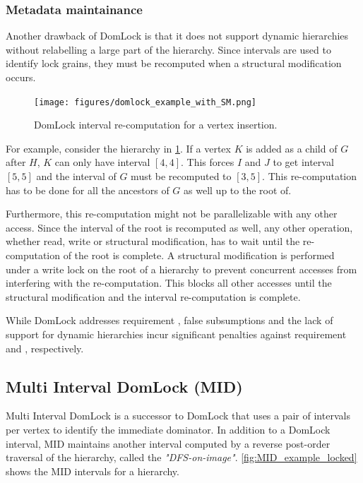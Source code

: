 \subsubsection{Metadata maintainance}

Another drawback of DomLock is that it does not support dynamic hierarchies without relabelling a large part of the hierarchy.
Since intervals are used to identify lock grains, they must be recomputed when a structural modification occurs.

\begin{figure}[h]
    \centering
    \captionsetup{justification=centering}
    \texttt{[image: figures/domlock\_example\_with\_SM.png]}
    \caption{DomLock interval re-computation for a vertex insertion.}
    \label{fig:domlock_example_SM}
\end{figure}

For example, consider the hierarchy in \cref{fig:domlock_example_SM}. If a vertex $K$ is added as a child of $G$ after $H$, $K$ can only have interval $[4,4]$. This forces $I$ and $J$ to get interval $[5,5]$ and the interval of $G$ must be recomputed to $[3,5]$. This re-computation has to be done for all the ancestors of $G$ as well up to the root of. 

Furthermore, this re-computation might not be parallelizable with any other access. Since the interval of the root is recomputed as well, any other operation, whether read, write or structural modification, has to wait until the re-computation of the root is complete. 
A structural modification is performed under a write lock on the root of a hierarchy to prevent concurrent accesses from interfering with the re-computation. This blocks all other accesses until the structural modification and the interval re-computation is complete. 


While DomLock addresses requirement \Rb, false subsumptions and the lack of support for dynamic hierarchies incur significant penalties against requirement \Rc and \Rd, respectively.



\subsection{Multi Interval DomLock (MID)}
Multi Interval DomLock \cite{anjuMID} is a successor to DomLock that uses a pair of intervals per vertex to identify the immediate dominator. In addition to a DomLock interval, MID maintains another interval computed by a reverse post-order traversal of the hierarchy, called the \emph{"DFS-on-image"}. \cref{fig:MID_example_locked} shows the MID intervals for a hierarchy. 

